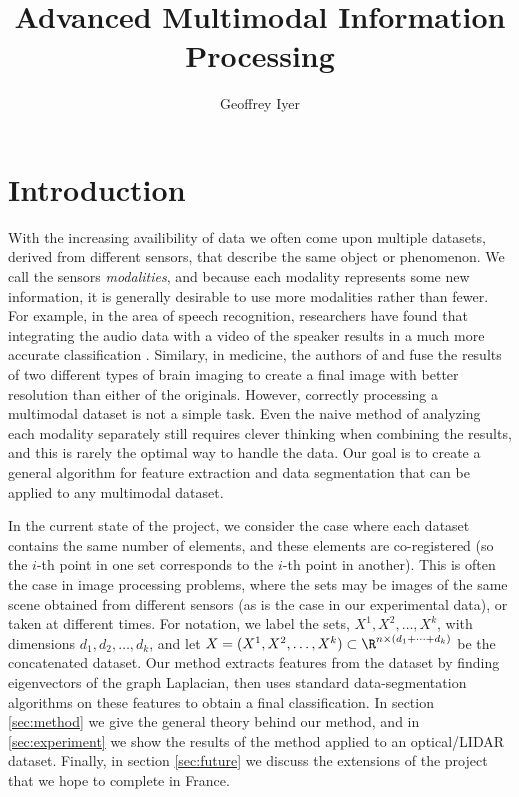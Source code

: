 \documentclass{article}[11pt]
\begin{document}
\title{\vspace{-3cm}Advanced Multimodal Information Processing\vspace{-0.3cm}}
\author{Geoffrey Iyer} \date{}

\maketitle

\section{Introduction}
\label{sec:intro}

With the increasing availibility of data we often come upon multiple datasets,
derived from different sensors, that describe the same object or phenomenon. We
call the sensors \emph{modalities}, and because each modality represents some
new information, it is generally desirable to use more modalities rather than
fewer. For example, in the area of speech recognition, researchers have found
that integrating the audio data with a video of the speaker results in a much
more accurate classification \cite{Potamianos03,
  sedighin:hal-01400542}. Similary, in medicine, the authors of \cite{Lei12} and
\cite{Samadi2016} fuse the results of two different types of brain imaging to
create a final image with better resolution than either of the
originals. However, correctly processing a multimodal dataset is not a simple
task. Even the naive method of analyzing each modality separately still requires
clever thinking when combining the results, and this is rarely the optimal way
to handle the data. Our goal is to create a general algorithm for feature
extraction and data segmentation that can be applied to any multimodal dataset.

In the current state of the project, we consider the case where each dataset
contains the same number of elements, and these elements are co-registered (so
the $i$-th point in one set corresponds to the $i$-th point in another). This is
often the case in image processing problems, where the sets may be images of the
same scene obtained from different sensors (as is the case in our experimental
data), or taken at different times. For notation, we label the sets,
$X^1,X^2,\ldots,X^k$, with dimensions $d_1,d_2,\ldots,d_k$, and let
$X = (X^1,X^2,\ldots,X^k)\subset \R^{n\times (d_1+\cdots+d_k)}$ be the
concatenated dataset. Our method extracts features from the dataset by finding
eigenvectors of the graph Laplacian, then uses standard data-segmentation
algorithms on these features to obtain a final classification.  In section
\ref{sec:method} we give the general theory behind our method, and in
\ref{sec:experiment} we show the results of the method applied to an
optical/LIDAR dataset. Finally, in section \ref{sec:future} we discuss the
extensions of the project that we hope to complete in France.
\end{document}
